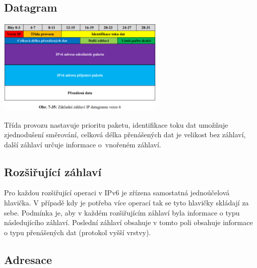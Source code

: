 \subsection{Datagram}
\begin{center}
	\includegraphics[width=0.6\textwidth]{obrazky/070.png}
\end{center}

Třída provozu nastavuje prioritu paketu, identifikace toku dat umožňuje zjednodušení směrování, celková délka přenášených dat je velikost bez záhlaví, další záhlaví určuje informace o~vnořeném záhlaví.

\subsection{Rozšiřující záhlaví}

Pro každou rozšiřující operaci v IPv6 je zřízena samostatná jednoúčelová hlavička.
V případě kdy je potřeba více operací tak se tyto hlavičky skládají za sebe. Podmínka je, aby v každém rozšiřujícím záhlaví byla informace o typu následujícího záhlaví.
Poslední záhlaví obsahuje v tomto poli obsahuje informace o typu přenášených dat (protokol vyšší vrstvy).

\subsection{Adresace}

